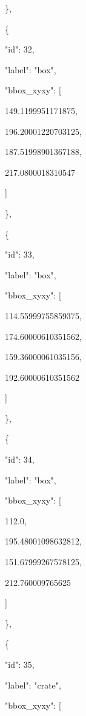 \documentclass[10pt,a4paper]{article}
\begin{document}
    \},\allowbreak{}\par
    \{\par
      "id":\allowbreak{} 32,\allowbreak{}\par
      "label":\allowbreak{} "box",\allowbreak{}\par
      "bbox\_xyxy":\allowbreak{} [\par
        149.1199951171875,\allowbreak{}\par
        196.20001220703125,\allowbreak{}\par
        187.51998901367188,\allowbreak{}\par
        217.0800018310547\par
      ]\par
    \},\allowbreak{}\par
    \{\par
      "id":\allowbreak{} 33,\allowbreak{}\par
      "label":\allowbreak{} "box",\allowbreak{}\par
      "bbox\_xyxy":\allowbreak{} [\par
        114.55999755859375,\allowbreak{}\par
        174.60000610351562,\allowbreak{}\par
        159.36000061035156,\allowbreak{}\par
        192.60000610351562\par
      ]\par
    \},\allowbreak{}\par
    \{\par
      "id":\allowbreak{} 34,\allowbreak{}\par
      "label":\allowbreak{} "box",\allowbreak{}\par
      "bbox\_xyxy":\allowbreak{} [\par
        112.0,\allowbreak{}\par
        195.48001098632812,\allowbreak{}\par
        151.67999267578125,\allowbreak{}\par
        212.760009765625\par
      ]\par
    \},\allowbreak{}\par
    \{\par
      "id":\allowbreak{} 35,\allowbreak{}\par
      "label":\allowbreak{} "crate",\allowbreak{}\par
      "bbox\_xyxy":\allowbreak{} [\par
\end{document}
